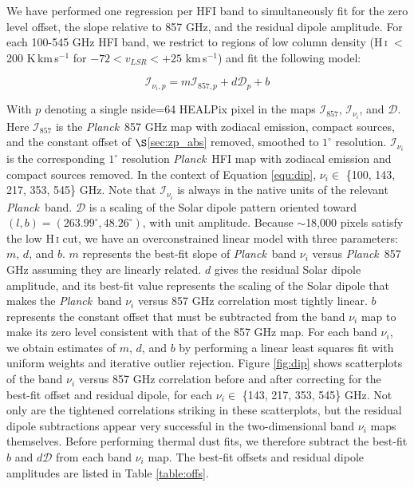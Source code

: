 \documentclass{emulateapj}
\newcommand{\PLANCK}{{\it Planck}}
\begin{document}
We have performed one regression per HFI band to simultaneously 
fit for the zero level offset, the slope relative to 857 GHz, and the residual 
dipole amplitude. For each 100-545 GHz HFI band, we restrict to regions of low
column density (H\,\textsc{i} $<$ 200 K\,km\,s$^{-1}$ for 
$-72$$<$$v_{LSR}$$<$$+25$ km\,s$^{-1}$) and fit the following model:

\begin{equation} \label{equ:dip}
\mathcal{I}_{\nu_i, p} = m\mathcal{I}_{857, p} + d\mathcal{D}_{p} + b
\end{equation}

With $p$ denoting a single nside=64 HEALPix pixel in the maps 
$\mathcal{I}_{857}$, $\mathcal{I}_{\nu_i}$, and $\mathcal{D}$. Here 
$\mathcal{I}_{857}$ is the \PLANCK~857 GHz map with zodiacal emission, compact 
sources, and the constant offset of $\S$\ref{sec:zp_abs} removed, smoothed to 
$1^{\circ}$ resolution. $\mathcal{I}_{\nu_i}$ is the corresponding $1^{\circ}$ 
resolution \PLANCK~HFI map with zodiacal emission and compact sources removed. 
In the context of Equation \ref{equ:dip}, $\nu_i \in$  
\{100, 143, 217, 353, 545\} GHz. Note that $\mathcal{I}_{\nu_i}$ is always in
the native units of the relevant \PLANCK~band. $\mathcal{D}$ is a scaling of 
the Solar dipole pattern oriented toward 
$(l, b) = (263.99^{\circ}, 48.26^{\circ})$, with unit amplitude. Because 
$\sim$18,000 pixels satisfy the low H\,\textsc{i} cut, we have an 
overconstrained linear model with three parameters: $m$, $d$, and $b$. $m$ 
represents the best-fit slope of \PLANCK~band $\nu_i$ versus \PLANCK~857 GHz 
assuming they are linearly related. $d$ gives the residual Solar dipole
amplitude, and its best-fit value represents the scaling of the Solar dipole 
that makes the \PLANCK~band $\nu_i$ versus 857 GHz correlation most tightly 
linear. $b$ represents the constant offset that must be subtracted from the 
band $\nu_i$ map to make its zero level consistent with that of the 857 GHz 
map. For each band $\nu_i$, we obtain estimates of $m$, $d$, and $b$ by 
performing a linear least squares fit with uniform weights and iterative 
outlier rejection. Figure \ref{fig:dip} shows scatterplots of the band $\nu_i$ 
versus 857 GHz correlation before and after correcting for the best-fit offset 
and residual dipole, for each $\nu_i \in$ \{143, 217, 353, 545\} GHz. Not only 
are the tightened correlations striking in these scatterplots, but the residual
dipole subtractions appear very successful in the two-dimensional band $\nu_i$ 
maps themselves. Before performing thermal dust fits, we therefore subtract the
best-fit $b$ and $d\mathcal{D}$ from each band $\nu_i$ map. The best-fit
offsets and residual dipole amplitudes are listed in Table \ref{table:offs}.
\end{document}
